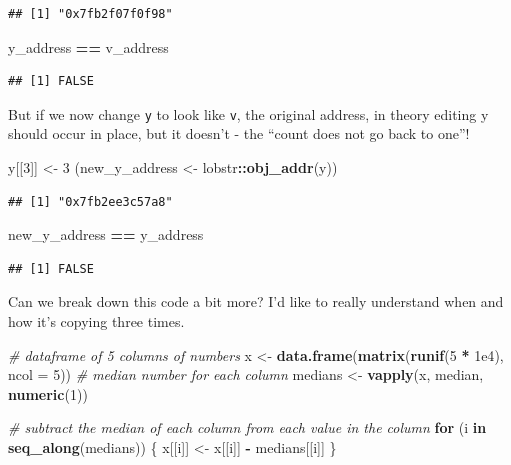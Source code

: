 \documentclass[]{book}
\newenvironment{Shaded}{\begin{snugshade}}{\end{snugshade}}
\newcommand{\CommentTok}[1]{\textcolor[rgb]{0.56,0.35,0.01}{\textit{#1}}}
\newcommand{\ControlFlowTok}[1]{\textcolor[rgb]{0.13,0.29,0.53}{\textbf{#1}}}
\newcommand{\DataTypeTok}[1]{\textcolor[rgb]{0.13,0.29,0.53}{#1}}
\newcommand{\DecValTok}[1]{\textcolor[rgb]{0.00,0.00,0.81}{#1}}
\newcommand{\FloatTok}[1]{\textcolor[rgb]{0.00,0.00,0.81}{#1}}
\newcommand{\KeywordTok}[1]{\textcolor[rgb]{0.13,0.29,0.53}{\textbf{#1}}}
\newcommand{\NormalTok}[1]{#1}
\newcommand{\OperatorTok}[1]{\textcolor[rgb]{0.81,0.36,0.00}{\textbf{#1}}}
\newcommand{\StringTok}[1]{\textcolor[rgb]{0.31,0.60,0.02}{#1}}
\begin{document}
\begin{verbatim}
## [1] "0x7fb2f07f0f98"
\end{verbatim}

\begin{Shaded}
\begin{Highlighting}[]
\NormalTok{y_address }\OperatorTok{==}\StringTok{ }\NormalTok{v_address}
\end{Highlighting}
\end{Shaded}

\begin{verbatim}
## [1] FALSE
\end{verbatim}

But if we now change \texttt{y} to look like \texttt{v}, the original address, in theory editing y should occur in place, but it doesn't - the ``count does not go back to one''!

\begin{Shaded}
\begin{Highlighting}[]
\NormalTok{y[[}\DecValTok{3}\NormalTok{]] <-}\StringTok{ }\DecValTok{3}
\NormalTok{(new_y_address <-}\StringTok{ }\NormalTok{lobstr}\OperatorTok{::}\KeywordTok{obj_addr}\NormalTok{(y))}
\end{Highlighting}
\end{Shaded}

\begin{verbatim}
## [1] "0x7fb2ee3c57a8"
\end{verbatim}

\begin{Shaded}
\begin{Highlighting}[]
\NormalTok{new_y_address }\OperatorTok{==}\StringTok{ }\NormalTok{y_address}
\end{Highlighting}
\end{Shaded}

\begin{verbatim}
## [1] FALSE
\end{verbatim}

Can we break down this code a bit more? I'd like to really understand when and how it's copying three times.

\begin{Shaded}
\begin{Highlighting}[]
\CommentTok{# dataframe of 5 columns of numbers}
\NormalTok{x <-}\StringTok{ }\KeywordTok{data.frame}\NormalTok{(}\KeywordTok{matrix}\NormalTok{(}\KeywordTok{runif}\NormalTok{(}\DecValTok{5} \OperatorTok{*}\StringTok{ }\FloatTok{1e4}\NormalTok{), }\DataTypeTok{ncol =} \DecValTok{5}\NormalTok{))}
\CommentTok{# median number for each column}
\NormalTok{medians <-}\StringTok{ }\KeywordTok{vapply}\NormalTok{(x, median, }\KeywordTok{numeric}\NormalTok{(}\DecValTok{1}\NormalTok{))}

\CommentTok{# subtract the median of each column from each value in the column}
\ControlFlowTok{for}\NormalTok{ (i }\ControlFlowTok{in} \KeywordTok{seq_along}\NormalTok{(medians)) \{}
\NormalTok{  x[[i]] <-}\StringTok{ }\NormalTok{x[[i]] }\OperatorTok{-}\StringTok{ }\NormalTok{medians[[i]]}
\NormalTok{\}}
\end{Highlighting}
\end{Shaded}
\end{document}

